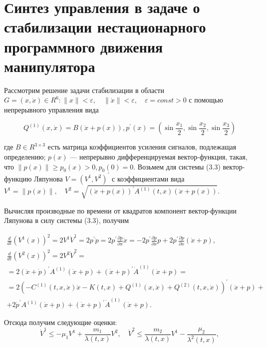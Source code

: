  
  \section{Синтез управления в задаче о стабилизации нестационарного программного движения манипулятора}%
 Рассмотрим решение задачи стабилизации в области $G = {(x, \dot x) \in R^6 : \|x\| < \varepsilon, \quad \|\dot x \| < \varepsilon, \quad \varepsilon = const>0}$
 с помощью непрерывного управления вида
 
 \begin{equation}
  Q^{(1)} (x, \dot x) = B(\dot x + p(x)),
  p^{'}(x) = (\sin \frac{x_1}{2}, \sin \frac{x_2}{2}, \sin \frac{x_3}{2})
 \end{equation}
 
 где $B \in R^{3 \times 3}$ есть матрица коэффициентов усиления сигналов, подлежащая определению; $p(x)$ --- непрерывно дифференцируемая вектор-функция, такая, что $\| p(x) \| \ge p_0(x) > 0, p_0(0) = 0$.
 Возьмем для системы (3.3) вектор-функцию Ляпунова $V = (V^1, V^2)^{'}$ с коэффициентами вида $V^1 = \|p(x)\|, \quad V^2 = \sqrt{(\dot x + p(x))^{'} A^{(1)} (t, x) (\dot x + p(x))}$.
 
 Вычисляя производные по времени от квадратов компонент вектор-функции Ляпунова  в силу системы (3.3), получим 
 
 \begin{equation*}
 \begin{array}{c}
 \displaystyle \frac{d}{dt} (V^1(x))^2 = 2 V^1 \dot V^1 = 2 p^{'} \dot p = 2 p^{'} \frac{\partial p }{\partial x} \dot x = -2 p^{'} \frac{\partial p }{\partial x} p + 2 p^{'} \frac{\partial p }{\partial x}(\dot x + p),\\
    \displaystyle \frac{d}{dt} (V^2(x))^2 = 2 V^2 \dot V^2 =\\
   \displaystyle = 2(\ddot x + \dot p)^{'} A^{(1)} (\dot x + p) + (\dot x + p)^{'} \dot A^{(1)} (\dot x + p) =\\
   \displaystyle = 2(- C^{(1)}(t, x, \dot x) \dot x - K(t, x) + Q^{(1)}(x, \dot x) + Q^{(2)}(t, x, \dot x))^{'} (\dot x + p) +\\
   \displaystyle + 2 \dot p^{'} A^{(1)} (\dot x + p) + (\dot x + p)^{'} \dot A^{(1)} (\dot x + p).
 \end{array}
 \end{equation*}
 
 Отсюда получим следующие оценки:
 $$\dot V^1 \le - \mu_1 V^1 + \frac{m_1}{\lambda(t, x)} V^2, \quad \dot V^2 \le \frac{m_2}{\lambda(t, x)} V^1 - \frac{\mu_2}{\lambda^2(t,x)},$$
 
